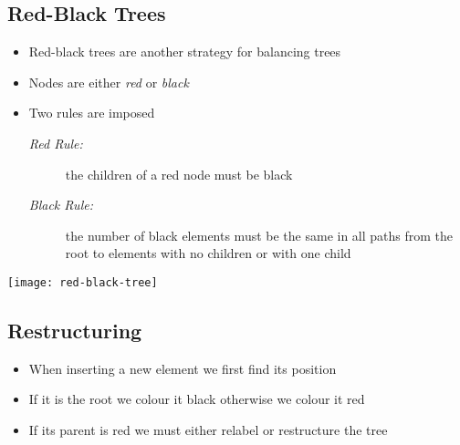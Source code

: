 \Outline %

\begin{slide}
\section[-2]{Red-Black Trees}

\begin{PauseHighLight}
  \begin{itemize}\squeeze
  \item Red-black trees are another strategy for balancing trees\pause
  \item Nodes are either \textit{red} or \textit{black}\pause
  \item Two rules are imposed\pause
    \begin{description}
    \item[\textit{Red Rule:}] the children of a red node must be
      black\pause
  \item[\textit{Black Rule:}] the number of black elements must be the
    same in all paths from the root to elements with no children or with
    one child\pause
    \end{description}
  \end{itemize}
  \begin{center}
    \texttt{[image: red-black-tree]}\pause
  \end{center}
\end{PauseHighLight}

\end{slide}


\begin{slide}
\section[-2]{Restructuring}

\pausebuild
\color{TwoColor}
\begin{itemize}\squeeze
\item When inserting a new element we first find its position\pause
\item If it is the root we colour it black otherwise we colour it
  red\pauseh
\item If its parent is red we must either relabel or restructure the
  tree\pauseh
\end{itemize}
\begin{center}\color{TextColor}
  \pause
\end{center}

\end{slide}

